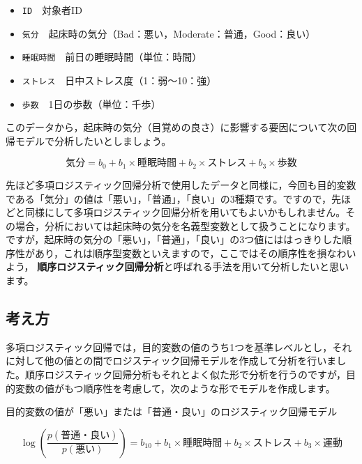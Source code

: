 \documentclass[
  12pt,
  a5jpaper,
  lualatex, ja=standard]{bxjsbook}
\providecommand{\tightlist}{%
  \setlength{\itemsep}{0pt}\setlength{\parskip}{0pt}}
\renewcommand{\emph}[1]{\textbf{\color{emph} #1}}
\newenvironment{jmvvar}{%
	\begin{center}%
	\begin{tcolorbox}[%
		title=変数一覧,
		colframe=daidai,
		colbacktitle=daidai!30!white,
		coltitle=daidai!10!black,
		colback=daidai!2!white,
		breakable,
		width=.9\textwidth
		]\small\addtolength{\leftmargini}{-3\labelsep}%
	}%
	{\end{tcolorbox}\end{center}}
\newenvironment{jmvgray}{%
	\begin{center}%
	\begin{tcolorbox}[%
		colframe=gline,
		colbacktitle=gmoji,
		colback=gmoji!2!white,
		breakable,
		width=.9\textwidth,
		]\small\addtolength{\leftmargini}{-3\labelsep}%
	}%
	{\end{tcolorbox}\end{center}}
\begin{document}
\begin{jmvvar}

\begin{itemize}
\tightlist
\item
  \texttt{ID}　対象者ID
\item
  \texttt{気分}　起床時の気分（Bad：悪い，Moderate：普通，Good：良い）
\item
  \texttt{睡眠時間}　前日の睡眠時間（単位：時間）
\item
  \texttt{ストレス}　日中ストレス度（1：弱〜10：強）
\item
  \texttt{歩数}　1日の歩数（単位：千歩）
\end{itemize}

\end{jmvvar}

このデータから，起床時の気分（目覚めの良さ）に影響する要因について次の回帰モデルで分析したいとしましょう。

\[
\text{気分} = b_0 + b_1 \times \text{睡眠時間} + b_2 \times \text{ストレス} + b_3 \times \text{歩数}
\]

先ほど多項ロジスティック回帰分析で使用したデータと同様に，今回も目的変数である「気分」の値は「悪い」，「普通」，「良い」の3種類です。ですので，先ほどと同様にして多項ロジスティック回帰分析を用いてもよいかもしれません。その場合，分析においては起床時の気分を名義型変数として扱うことになります。ですが，起床時の気分の「悪い」，「普通」，「良い」の3つ値にははっきりした順序性があり，これは順序型変数といえますので，ここではその順序性を損なわいよう，\emph{順序ロジスティック回帰分析}と呼ばれる手法を用いて分析したいと思います。

\hypertarget{sub:regression-ordinal}{%
\subsection{考え方}\label{sub:regression-ordinal}}

多項ロジスティック回帰では，目的変数の値のうち1つを基準レベルとし，それに対して他の値との間でロジスティック回帰モデルを作成して分析を行いました。順序ロジスティック回帰分析もそれとよく似た形で分析を行うのですが，目的変数の値がもつ順序性を考慮して，次のような形でモデルを作成します。

\begin{jmvgray}
目的変数の値が「悪い」または「普通・良い」のロジスティック回帰モデル

\[
\log\left(\displaystyle\frac{p(\text{普通・良い})}{p(\text{悪い})}\right) = b_{10} + b_1 \times \text{睡眠時間} + b_2 \times \text{ストレス} + b_3 \times \text{運動}
\]

\end{jmvgray}
\end{document}
